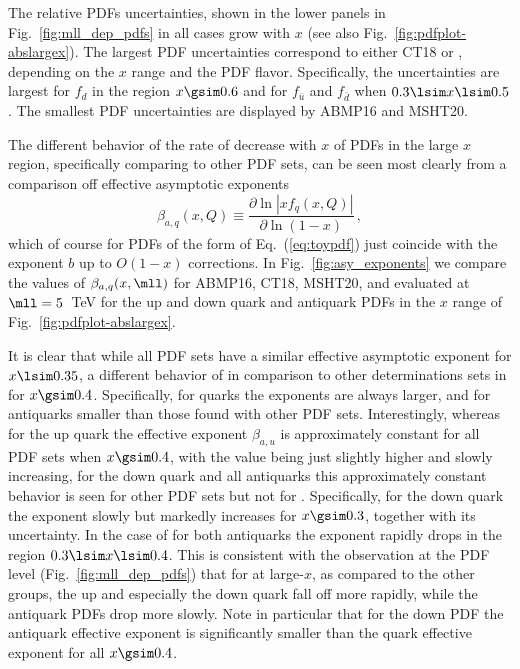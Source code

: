 The relative PDFs uncertainties, shown
in the lower panels in
Fig.~\ref{fig:mll_dep_pdfs}  in all cases
grow with $x$ (see also  Fig.~\ref{fig:pdfplot-abslargex}).
%
The largest PDF uncertainties correspond to either CT18 or , 
depending on the $x$ range and the PDF flavor.
%
Specifically, the  uncertainties are largest for $f_d$ in the
region $x\gsim 0.6$ 
and for $f_{\bar{u}}$ and $f_{\bar{d}}$ when $0.3 \lsim x \lsim 0.5$.
%
The smallest PDF uncertainties are displayed by ABMP16 and  MSHT20.

The different behavior of the rate of decrease with $x$ of
PDFs  in the large $x$ region, specifically comparing 
to other PDF sets, can  be seen most clearly from a comparison off
effective asymptotic exponents~\cite{Ball:2016spl}
\begin{equation}
  \beta_{a,q}(x,Q)\equiv\frac{\partial \ln|xf_q(x,Q)|}{\partial \ln(1-x)}\,,
  \label{eq:beta_asy}
\end{equation}
which of course for PDFs of the form of Eq.~(\ref{eq:toypdf}) just
coincide with the exponent $b$ up to $O(1-x)$ corrections.
In Fig.~\ref{fig:asy_exponents} we compare
the values of $\beta_{a,q}(x,\mll)$
for ABMP16, CT18, MSHT20, and  evaluated at $\mll=5$~TeV
for the up and down quark and antiquark PDFs in the  $x$ range of
Fig.~\ref{fig:pdfplot-abslargex}.

It is clear that while all PDF
sets have a similar effective asymptotic exponent for $x\lsim 0.35$, a
different behavior of  in comparison to other
determinations sets in for $x\gsim 0.4$.
%
Specifically, for quarks the  exponents are always larger,
and for antiquarks smaller than those found with other PDF
sets.
%
Interestingly, whereas for the up quark the
effective exponent $\beta_{a,u}$ is approximately constant for all
PDF sets when  $x\gsim 0.4$, with the  value being just
slightly higher and slowly increasing, for the down quark and all
antiquarks this approximately constant behavior is seen for other
PDF sets but not for .
%
Specifically, for the  down quark
the exponent slowly but markedly increases for $x\gsim 0.3$, together 
with its uncertainty.
%
In the case of  for both antiquarks the exponent
rapidly drops  in the region $0.3 \lsim x \lsim 0.4$.
%
This is consistent with the observation at the PDF level
(Fig.~\ref{fig:mll_dep_pdfs})  that for 
at large-$x$, as compared to the other groups,
the up and especially the down  quark fall off more rapidly, while
the antiquark PDFs drop more slowly. Note in particular that for
the down PDF the antiquark effective exponent is significantly
smaller than the quark effective exponent for all $x\gsim0.4$.

